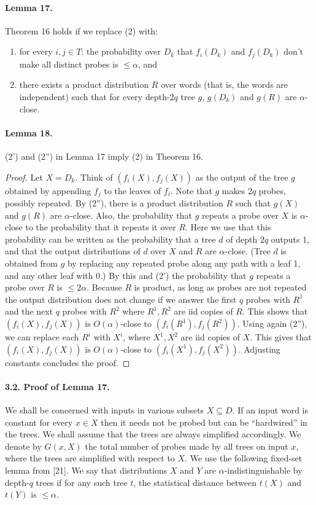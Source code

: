 \documentclass[10pt,a4paper]{article}
\begin{document}
\paragraph{Lemma 17.}
Theorem 16 holds if we replace (2) with:
\begin{enumerate}
\item[(2')] for every $i,j\in T$: the probability over $D_k$ that $f_i(D_k)$ and $f_j(D_k)$ don't make all distinct probes is $\leq\alpha$, and
\item[(2'')] there exists a product distribution $R$ over words (that is, the words are independent) such that for every depth-$2q$ tree $g$, $g(D_k)$ and $g(R)$ are $\alpha$-close.
\end{enumerate}
\paragraph{Lemma 18.}
(2') and (2'') in Lemma 17 imply (2) in Theorem 16.
\begin{proof}
Let $X=D_k$. Think of $(f_i(X),f_j(X))$ as the output of the tree $g$ obtained by appending $f_j$ to the leaves of $f_i$. Note that $g$ makes $2q$ probes, possibly repeated. By (2''), there is a product distribution $R$ such that $g(X)$ and $g(R)$ are $\alpha$-close. Also, the probability that $g$ repeats a probe over $X$ is $\alpha$-close to the probability that it repeats it over $R$. Here we use that this probability can be written as the probability that a tree $d$ of depth $2q$ outputs 1, and that the output distributions of $d$ over $X$ and $R$ are $\alpha$-close. (Tree $d$ is obtained from $g$ by replacing any repeated probe along any path with a leaf 1, and any other leaf with 0.)
By this and (2') the probability that $g$ repeats a probe over $R$ is $\leq2\alpha$. Because $R$ is product, as long as probes are not repeated the output distribution does not change if we answer the first $q$ probes with $R^1$ and the next $q$ probes with $R^2$ where $R^1,R^2$ are iid copies of $R$. This shows that $(f_i(X),f_j(X))$ is $O(\alpha)$-close to $(f_i(R^1),f_j(R^2))$. Using again (2''), we can replace each $R^i$ with $X^i$, where $X^1,X^2$ are iid copies of $X$. This gives that $(f_i(X),f_j(X))$ is $O(\alpha)$-close to $(f_i(X^1),f_j(X^2))$. Adjusting constants concludes the proof.
\end{proof}
\paragraph{3.2. Proof of Lemma 17.}
We shall be concerned with inputs in various subsets $X\subseteq D$. If an input word is constant for every $x\in X$ then it needs not be probed but can be ``hardwired'' in the trees. We shall assume that the trees are always simplified accordingly. We denote by $G(x,X)$ the total number of probes made by all trees on input $x$, where the trees are simplified with respect to $X$.
We use the following fixed-set lemma from [21]. We say that distributions $X$ and $Y$ are $\alpha$-indistinguishable by depth-$q$ trees if for any such tree $t$, the statistical distance between $t(X)$ and $t(Y)$ is $\leq\alpha$.
\end{document}
